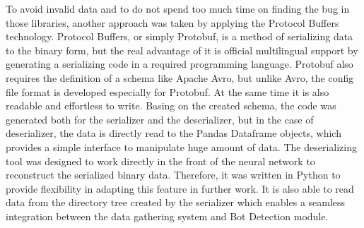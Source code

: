 To avoid invalid data and to do not spend too much time on finding the bug in those libraries, another approach was taken by applying the Protocol Buffers technology.
Protocol Buffers, or simply Protobuf, is a method of serializing data to the binary form, but the real advantage of it is official multilingual support by generating a serializing code in a required programming language.
Protobuf also requires the definition of a schema like Apache Avro, but unlike Avro, the config file format is developed especially for Protobuf.
At the same time it is also readable and effortless to write.
Basing on the created schema, the code was generated both for the serializer and the deserializer, but in the case of deserializer, the data is directly read to the Pandas Dataframe objects, which provides a simple interface to manipulate huge amount of data.
The deserializing tool was designed to work directly in the front of the neural network to reconstruct the serialized binary data.
Therefore, it was written in Python to provide flexibility in adapting this feature in further work.
It is also able to read data from the directory tree created by the serializer which enables a seamless integration between the data gathering system and Bot Detection module.